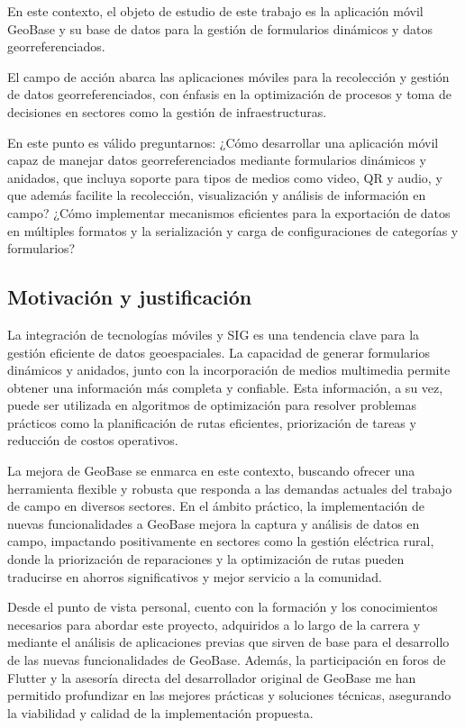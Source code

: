 \documentclass{article}
\begin{document}
En este contexto, el objeto de estudio de este trabajo es la aplicación móvil GeoBase y su base de datos para la gestión de formularios dinámicos y datos georreferenciados.

El campo de acción abarca las aplicaciones móviles para la recolección y gestión de datos georreferenciados, con énfasis en la optimización de procesos y toma de decisiones en sectores como la gestión de infraestructuras.

En este punto es válido preguntarnos: ¿Cómo desarrollar una aplicación móvil capaz de manejar datos georreferenciados mediante formularios dinámicos y anidados, que incluya soporte para tipos de medios como video, QR y audio, y que además facilite la recolección, visualización y análisis de información en campo? ¿Cómo implementar mecanismos eficientes para la exportación de datos en múltiples formatos y la serialización y carga de configuraciones de categorías y formularios?

\subsection{Motivación y
justificación}\label{motivaciuxf3n-y-justificaciuxf3n}

La integración de tecnologías móviles y SIG es una tendencia clave para la gestión eficiente de datos geoespaciales. La capacidad de generar formularios dinámicos y anidados, junto con la incorporación de medios multimedia permite obtener una información más completa y confiable. Esta información, a su vez, puede ser utilizada en algoritmos de optimización para resolver problemas prácticos como la planificación de rutas eficientes, priorización de tareas y reducción de costos operativos.

La mejora de GeoBase se enmarca en este contexto, buscando ofrecer una herramienta flexible y robusta que responda a las demandas actuales del trabajo de campo en diversos sectores. En el ámbito práctico, la implementación de nuevas funcionalidades a GeoBase mejora la captura y análisis de datos en campo, impactando positivamente en sectores como la gestión eléctrica rural, donde la priorización de reparaciones y la optimización de rutas pueden traducirse en ahorros significativos y mejor servicio a la comunidad.

Desde el punto de vista personal, cuento con la formación y los conocimientos necesarios para abordar este proyecto, adquiridos a lo largo de la carrera y mediante el análisis de aplicaciones previas que sirven de base para el desarrollo de las nuevas funcionalidades de GeoBase. Además, la participación en foros de Flutter y la asesoría directa del desarrollador original de GeoBase me han permitido profundizar en las mejores prácticas y soluciones técnicas, asegurando la viabilidad y calidad de la implementación propuesta.
\end{document}
